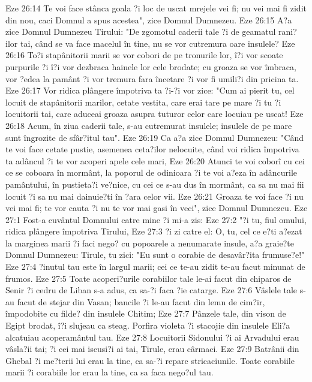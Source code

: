 Eze 26:14  Te voi face stânca goala ?i loc de uscat mrejele vei fi; nu vei mai fi zidit din nou, caci Domnul a spus acestea", zice Domnul Dumnezeu.
Eze 26:15  A?a zice Domnul Dumnezeu Tirului: "De zgomotul caderii tale ?i de geamatul rani?ilor tai, când se va face macelul în tine, nu se vor cutremura oare insulele?
Eze 26:16  To?i stapânitorii marii se vor cobori de pe tronurile lor, î?i vor scoate purpurile ?i î?i vor dezbraca hainele lor cele brodate; cu groaza se vor îmbraca, vor ?edea la pamânt ?i vor tremura fara încetare ?i vor fi umili?i din pricina ta.
Eze 26:17  Vor ridica plângere împotriva ta ?i-?i vor zice: "Cum ai pierit tu, cel locuit de stapânitorii marilor, cetate vestita, care erai tare pe mare ?i tu ?i locuitorii tai, care aduceai groaza asupra tuturor celor care locuiau pe uscat!
Eze 26:18  Acum, în ziua caderii tale, s-au cutremurat insulele; insulele de pe mare sunt îngrozite de sfâr?itul tau".
Eze 26:19  Ca a?a zice Domnul Dumnezeu: "Când te voi face cetate pustie, asemenea ceta?ilor nelocuite, când voi ridica împotriva ta adâncul ?i te vor acoperi apele cele mari,
Eze 26:20  Atunci te voi coborî cu cei ce se coboara în mormânt, la poporul de odinioara ?i te voi a?eza în adâncurile pamântului, în pustieta?i ve?nice, cu cei ce s-au dus în mormânt, ca sa nu mai fii locuit ?i sa nu mai dainuie?ti în ?ara celor vii.
Eze 26:21  Groaza te voi face ?i nu vei mai fi; te vor cauta ?i nu te vor mai gasi în veci", zice Domnul Dumnezeu.
Eze 27:1  Fost-a cuvântul Domnului catre mine ?i mi-a zis:
Eze 27:2  "?i tu, fiul omului, ridica plângere împotriva Tirului,
Eze 27:3  ?i zi catre el: O, tu, cel ce e?ti a?ezat la marginea marii ?i faci nego? cu popoarele a nenumarate insule, a?a graie?te Domnul Dumnezeu: Tirule, tu zici: "Eu sunt o corabie de desavâr?ita frumuse?e!"
Eze 27:4  ?inutul tau este în largul marii; cei ce te-au zidit te-au facut minunat de frumos.
Eze 27:5  Toate acoperi?urile corabiilor tale le-ai facut din chiparos de Senir ?i cedru de Liban s-a adus, ca sa-?i faca ?ie catarge.
Eze 27:6  Vâslele tale s-au facut de stejar din Vasan; bancile ?i le-au facut din lemn de cim?ir, împodobite cu filde? din insulele Chitim;
Eze 27:7  Pânzele tale, din vison de Egipt brodat, î?i slujeau ca steag. Porfira violeta ?i stacojie din insulele Eli?a alcatuiau acoperamântul tau.
Eze 27:8  Locuitorii Sidonului ?i ai Arvadului erau vâsla?ii tai; ?i cei mai iscusi?i ai tai, Tirule, erau cârmaci.
Eze 27:9  Batrânii din Ghebal ?i me?terii lui erau la tine, ca sa-?i repare stricaciunile. Toate corabiile marii ?i corabiile lor erau la tine, ca sa faca nego?ul tau.
